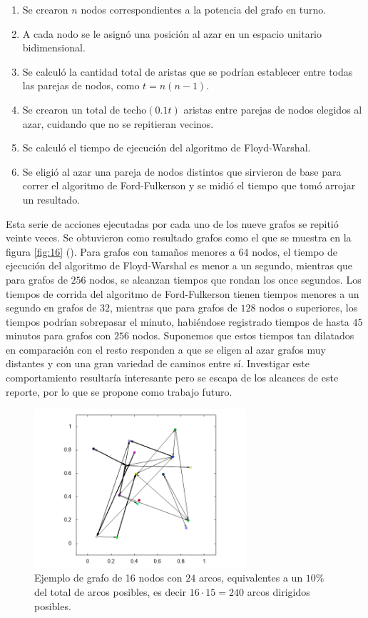 \documentclass{article}
\begin{document}
  \begin{enumerate}
    \item Se crearon $n$ nodos correspondientes a la potencia del grafo en turno.
    \item A cada nodo se le asignó una posición al azar en un espacio unitario bidimensional.
    \item Se calculó la cantidad total de aristas que se podrían establecer entre todas las parejas de nodos, como $t = n (n - 1)$.
    \item Se crearon un total de $\mathrm{techo}(0.1 t)$ aristas entre parejas de nodos elegidos al azar, cuidando que no se repitieran vecinos.
    \item Se calculó el tiempo de ejecución del algoritmo de Floyd-Warshal.
    \item Se eligió al azar una pareja de nodos distintos que sirvieron de base para correr el algoritmo de Ford-Fulkerson y se midió el tiempo que tomó arrojar un resultado.
  \end{enumerate}

  Esta serie de acciones ejecutadas por cada uno de los nueve grafos se repitió veinte veces. Se obtuvieron como resultado grafos como el que se muestra en la figura \ref{fig:16} (\pageref{fig:16}). Para grafos con tamaños menores a $64$ nodos, el tiempo de ejecución del algoritmo de Floyd-Warshal es menor a un segundo, mientras que para grafos de $256$ nodos, se alcanzan tiempos que rondan los once segundos. Los tiempos de corrida del algoritmo de Ford-Fulkerson tienen tiempos menores a un segundo en grafos de $32$, mientras que para grafos de $128$ nodos o superiores, los tiempos podrían sobrepasar el minuto, habiéndose registrado tiempos de hasta $45$ minutos para grafos con $256$ nodos. Suponemos que estos tiempos tan dilatados en comparación con el resto responden a que se eligen al azar grafos muy distantes y con una gran variedad de caminos entre sí. Investigar este comportamiento resultaría interesante pero se escapa de los alcances de este reporte, por lo que se propone como trabajo futuro.

  \begin{figure}[h]
    \includegraphics[width=0.7\textwidth]{16} %
    \centering
    \caption{Ejemplo de grafo de 16 nodos con $24$ arcos, equivalentes a un $10 \%$ del total de arcos posibles, es decir $16 \cdot 15 = 240$ arcos dirigidos posibles.}
    \label{fig:boxplotFord}
  \end{figure}
\end{document}
